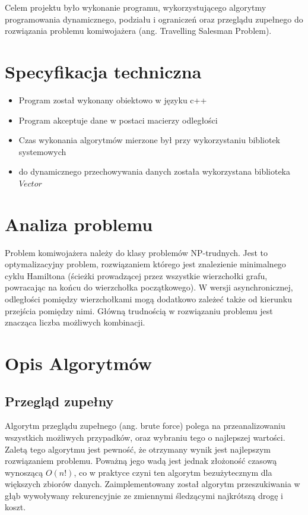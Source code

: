 \documentclass{article}
\begin{document}
Celem projektu było wykonanie programu, wykorzystującego algorytmy programowania dynamicznego, podziału i ograniczeń oraz przeglądu zupełnego do rozwiązania problemu komiwojażera
(ang. Travelling Salesman Problem).

\section{Specyfikacja techniczna}

\begin{itemize}
\item Program został wykonany obiektowo w języku c++
\item Program akceptuje dane w postaci macierzy odległości
\item Czas wykonania algorytmów mierzone był przy wykorzystaniu bibliotek systemowych
\item do dynamicznego przechowywania danych została wykorzystana biblioteka $Vector$

\end{itemize}

\section{Analiza problemu}

Problem komiwojażera należy do klasy problemów NP-trudnych. Jest to
optymalizacyjny problem, rozwiązaniem którego jest znalezienie minimalnego cyklu Hamiltona
(ścieżki prowadzącej przez wszystkie wierzchołki grafu, powracając na końcu do wierzchołka
początkowego). W wersji asynchronicznej, odległości pomiędzy
wierzchołkami mogą dodatkowo zależeć także od kierunku przejścia pomiędzy nimi. Główną
trudnością w rozwiązaniu problemu jest znacząca liczba możliwych kombinacji.


\section{Opis Algorytmów}

\subsection{Przegląd zupełny}

Algorytm przeglądu zupełnego (ang. brute force) polega na przeanalizowaniu wszystkich
możliwych przypadków, oraz wybraniu tego o najlepszej wartości. Zaletą tego algorytmu jest pewność,
że otrzymany wynik jest najlepszym rozwiązaniem problemu. Poważną jego wadą jest jednak
złożoność czasową wynoszącą $O(n!)$, co w praktyce czyni ten algorytm bezużytecznym dla większych
zbiorów danych. Zaimplementowany został algorytm przeszukiwania w głąb wywoływany rekurencyjnie ze zmiennymi śledzącymi najkrótszą drogę i koszt.\\\\\\
\end{document}
